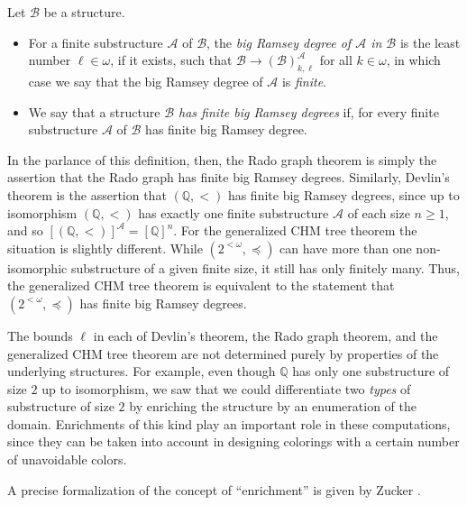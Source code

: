 \begin{definition}\label{D:bigRamsey}
	Let $\mathcal{B}$ be a structure.
	\begin{itemize}
		\item For a finite substructure $\mathcal{A}$ of $\mathcal{B}$, the \emph{big Ramsey degree of $\mathcal{A}$ in $\mathcal{B}$} is the least number $\ell \in \omega$, if it exists, such that $\mathcal{B} \to (\mathcal{B})^\mathcal{A}_{k,\ell}$ for all $k \in \omega$, in which case we say that the big Ramsey degree of $\mathcal{A}$ is \emph{finite}.
		\item We say that a structure \emph{$\mathcal{B}$ has finite big Ramsey degrees} if, for every finite substructure $\mathcal{A}$ of $\mathcal{B}$ has finite big Ramsey degree.
	\end{itemize}
\end{definition}

\noindent In the parlance of this definition, then, the Rado graph theorem is simply the assertion that the Rado graph has finite big Ramsey degrees. Similarly, Devlin's theorem is the assertion that $(\mathbb{Q},<)$ has finite big Ramsey degrees, since up to isomorphism $(\mathbb{Q},<)$ has exactly one finite substructure $\mathcal{A}$ of each size $n \geq 1$, and so $[(\mathbb{Q},<)]^\mathcal{A} = [\mathbb{Q}]^n$. For the generalized CHM tree theorem the situation is slightly different. While $(2^{<\omega},\preceq)$ can have more than one non-isomorphic substructure of a given finite size, it still has only finitely many. Thus, the generalized CHM tree theorem is equivalent to the statement that $(2^{<\omega},\preceq)$ has finite big Ramsey degrees.

The bounds $\ell$ in each of Devlin's theorem, the Rado graph theorem, and the generalized CHM tree theorem are not determined purely by properties of the underlying structures. For example, even though $\mathbb{Q}$ has only one substructure of size $2$ up to isomorphism, we saw that we could differentiate two \emph{types} of substructure of size $2$ by enriching the structure by an enumeration of the domain. Enrichments of this kind play an important role in these computations, since they can be taken into account in designing colorings with a certain number of unavoidable colors.

A precise formalization of the concept of ``enrichment'' is given by Zucker \cite{Zucker-2019}.

